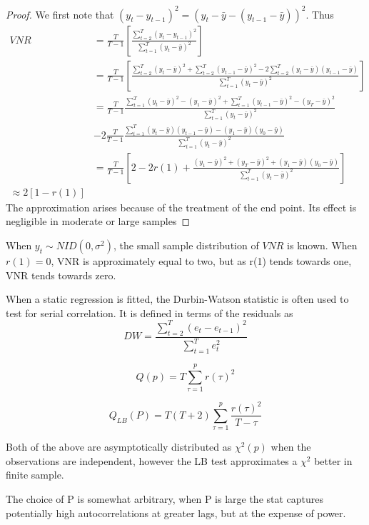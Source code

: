 \documentclass[DIV=14,titlepage=false]{scrreprt}
\begin{document}
\begin{proof}
    We first note that $(y_t - y_{t-1})^2 = (y_t - \bar y - (y_{t-1}-\bar y))^2$. Thus
    \begin{align*}
        VNR &= \frac{T}{T-1}\left[\frac{\sum_{t=2}^{T} (y_t - y_{t-1})^2}{\sum_{t=1}^{T}(y_t - \bar y)^2} \right] \\
        &= \frac{T}{T-1}\left[\frac{\sum_{t=2}^{T} (y_t - \bar y)^2 + \sum_{t=2}^{T} (y_{t-1} - \bar y)^2 - 2 \sum_{t=2}^{T} (y_t - \bar y)(y_{t-1} - \bar y)}{\sum_{t=1}^{T}(y_t - \bar y)^2} \right] \\
        &= \frac{T}{T-1}\frac{\sum_{t=1}^T (y_t - \bar y)^2 - (y_1-\bar y)^2 + \sum_{t=1}^{T} (y_{t-1} - \bar y)^2 - (y_T - \bar y)^2 }{\sum_{t=1}^{T}(y_t - \bar y)^2} \\
        &-2 \frac{T}{T-1} \frac{\sum_{t=1}^{T} (y_t - \bar y)(y_{t-1} - \bar y) -(y_1 - \bar y)(y_0-\bar y)}{\sum_{t=1}^{T}(y_t - \bar y)^2} \\
        &= \frac{T}{T-1} \left[ 2 - 2r(1) + \frac{(y_1-\bar y)^2 + (y_T - \bar y)^2+ (y_1 - \bar y)(y_0-\bar y)}{\sum_{t=1}^{T}(y_t - \bar y)^2} \right] \\
        \approx 2[1-r(1)]
    \end{align*}
The approximation arises because of the treatment of the end point. Its effect is negligible in moderate or large samples
\end{proof}
When $y_t \sim NID(0, \sigma^2)$, the small sample distribution of $VNR$ is known. When $r(1)=0$, VNR is approximately equal to two, but as r(1) tends towards one, VNR tends towards zero.
\begin{definition}
    When a static regression is fitted, the Durbin-Watson statistic is often used to test for serial correlation. It is defined in terms of the residuals as
    \[
        DW = \frac{\sum_{t=2}^{T} (e_t - e_{t-1})^2}{\sum_{t=1}^{T}e_t ^2}
    \]
\end{definition}
\begin{definition}
    \[
        Q(p) = T \sum_{\tau=1}^{p} r(\tau)^2
    \]
\end{definition}
\begin{definition}
    \[
        Q_{LB}(P) = T(T+2) \sum_{\tau=1}^{p} \frac{r(\tau)^2}{T-\tau}
    \]
\end{definition}
Both of the above are asymptotically distributed as $\chi^2(p)$ when the observations are independent, however the LB test approximates a $\chi^2$ better in finite sample.
\begin{note}
    The choice of P is somewhat arbitrary, when P is large the stat captures potentially high autocorrelations at greater lags, but at the expense of power.
\end{note}
\end{document}
